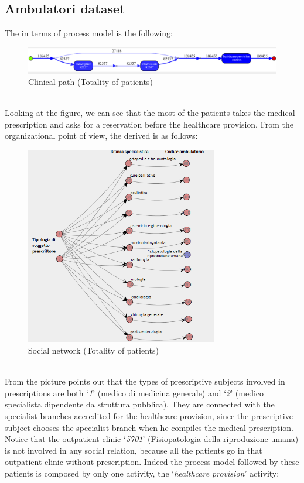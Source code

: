 \subsection{Ambulatori dataset} \label{analysis:1}
The  in terms of process model is the following:
\begin{figure}[htbp]
\includegraphics[width=\textwidth , keepaspectratio]{AmbulatoriInductiveVisualMiner.png}
\caption{Clinical path (Totality of patients)}
\end{figure}\\
Looking at the figure, we can see that the most of the patients takes the medical prescription and asks for a reservation before the healthcare provision. From the organizational point of view, the  derived is as follows:
\begin{figure}[htbp]
\includegraphics[width=0.75\textwidth, keepaspectratio]{AmbulatoriSocialNetwork}
\caption{Social network (Totality of patients)}
\end{figure}\\
From the picture points out that the types of prescriptive subjects involved in prescriptions are both `\textit{1}' (medico di medicina generale) and `\textit{2}' (medico specialista dipendente da struttura pubblica). They are connected with the specialist branches accredited for the healthcare provision, since the prescriptive subject chooses the specialist branch when he compiles the medical prescription. Notice that the outpatient clinic `\textit{5701}' (Fisiopatologia della riproduzione umana) is not involved in any social relation, because all the patients go in that outpatient clinic without prescription. Indeed the process model followed by these patients is composed by only one activity, the `\textit{healthcare provision}' activity:
